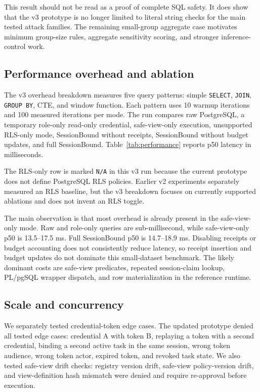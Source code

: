 \documentclass[journal]{IEEEtran}
\begin{document}
This result should not be read as a proof of complete SQL safety. It
does show that the v3 prototype is no longer limited to literal string
checks for the main tested attack families. The remaining small-group
aggregate case motivates minimum group-size rules, aggregate sensitivity
scoring, and stronger inference-control work.

\hypertarget{performance-overhead-and-ablation}{%
\subsection{Performance overhead and
ablation}\label{performance-overhead-and-ablation}}

The v3 overhead breakdown measures five query patterns: simple
\texttt{SELECT}, \texttt{JOIN}, \texttt{GROUP\ BY}, CTE, and window
function. Each pattern uses 10 warmup iterations and 100 measured
iterations per mode. The run compares raw PostgreSQL, a temporary
role-only read-only credential, safe-view-only execution, unsupported
RLS-only mode, SessionBound without receipts, SessionBound without
budget updates, and full SessionBound. Table~\ref{tab:performance}
reports p50 latency in milliseconds.

The RLS-only row is marked \texttt{N/A} in this v3 run because the
current prototype does not define PostgreSQL RLS policies. Earlier v2
experiments separately measured an RLS baseline, but the v3 breakdown
focuses on currently supported ablations and does not invent an RLS
toggle.

The main observation is that most overhead is already present in the
safe-view-only mode. Raw and role-only queries are sub-millisecond, while
safe-view-only p50 is 13.5--17.5 ms. Full SessionBound p50 is
14.7--18.9 ms. Disabling receipts or budget accounting does not
consistently reduce latency, so receipt insertion and budget updates do
not dominate this small-dataset benchmark. The likely dominant costs are
safe-view predicates, repeated session-claim lookup, PL/pgSQL wrapper
dispatch, and row materialization in the reference runtime.

\hypertarget{scale-and-concurrency}{%
\subsection{Scale and concurrency}\label{scale-and-concurrency}}

We separately tested credential-token edge cases. The updated prototype
denied all tested edge cases: credential A with token B, replaying a
token with a second credential, binding a second active task in the same
session, wrong token audience, wrong token actor, expired token, and
revoked task state. We also tested safe-view drift checks: registry
version drift, safe-view policy-version drift, and view-definition hash
mismatch were denied and require re-approval before execution.
\end{document}
